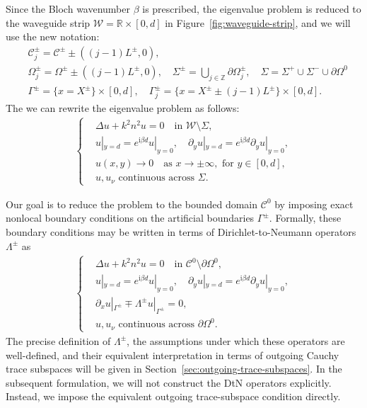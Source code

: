 \documentclass[11pt,fleqn]{article}
\newcommand{\ii}{\mathrm{i}}
\theoremstyle{definition}
\theoremstyle{remark}
\begin{document}
Since the Bloch wavenumber $\beta$ is prescribed, the eigenvalue problem is reduced to the 
waveguide strip $\mathcal{W} = \mathbb{R} \times [0, d]$ in Figure~\ref{fig:waveguide-strip}, and we will use the new notation: \begin{align*}
  &\mathcal{C}^\pm_j = \mathcal{C}^\pm \pm ((j-1)L^\pm, 0),\\
  &\Omega^\pm_j = \Omega^\pm \pm ((j-1)L^\pm, 0),\quad \Sigma^\pm = \bigcup_{j\in\mathbb{Z}} \partial\Omega^\pm_j,\quad \Sigma = \Sigma^+ \cup \Sigma^- \cup \partial \Omega^0\\
  &\Gamma^\pm = \{x = X^\pm\} \times [0,d],\quad \Gamma^\pm_j = \{x = X^\pm \pm (j-1)L^\pm\} \times [0,d].
\end{align*}
The we can rewrite the eigenvalue problem as follows:
\begin{align}
\begin{cases}
  &\Delta u + k^2 n^2 u = 0 \quad \text{in } \mathcal{W}\setminus \Sigma,\\
  &u|_{y = d} = e^{\ii\beta d} u|_{y = 0}, \quad \partial_y u|_{y = d} = e^{\ii\beta d} \partial_y u|_{y = 0},\\
  &u(x,y)\to 0 \quad \text{as } x\to\pm\infty,
    \text{ for } y\in[0,d],\\
  &u, u_\nu \text{ continuous across } \Sigma.
\end{cases}
\end{align}

Our goal is to reduce the problem to the bounded domain $\mathcal C^0$
by imposing exact nonlocal boundary conditions on the artificial
boundaries $\Gamma^\pm$. Formally, these boundary conditions may be
written in terms of Dirichlet-to-Neumann operators $\Lambda^\pm$ as
\begin{align}
\begin{cases}
  &\Delta u + k^2 n^2 u = 0 \quad \text{in } \mathcal{C}^0\setminus \partial \Omega^0,\\
  &u|_{y = d} = e^{\ii\beta d} u|_{y = 0}, \quad \partial_y u|_{y = d} = e^{\ii\beta d} \partial_y u|_{y = 0},\\
  &\partial_x u |_{\Gamma^\pm} \mp \Lambda^\pm u|_{\Gamma^\pm} = 0,\\
  &u, u_\nu \text{ continuous across } \partial \Omega^0.
\end{cases}\label{eq:dtn-cell-problem}
\end{align}
The precise definition of $\Lambda^\pm$, the assumptions under which
these operators are well-defined, and their equivalent interpretation
in terms of outgoing Cauchy trace subspaces will be given in
Section~\ref{sec:outgoing-trace-subspaces}. In the subsequent formulation, we will not construct the DtN operators
explicitly. Instead, we impose the equivalent outgoing trace-subspace
condition directly.
\end{document}

